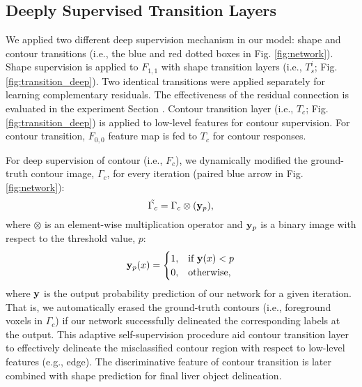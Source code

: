 \documentclass[journal]{IEEEtran}
\begin{document}
\subsection{Deeply Supervised Transition Layers}
We applied two different deep supervision mechanism in our model: shape and contour transitions (i.e., the blue and red dotted boxes in Fig. \ref{fig:network}). Shape supervision is applied to \(F_{1,1}\) with shape transition layers (i.e., \(T^i_s\); Fig. \ref{fig:transition_deep}). Two identical transitions were applied separately for learning complementary residuals. The effectiveness of the residual connection is evaluated in the experiment Section . Contour transition layer (i.e., \(T_c\); Fig. \ref{fig:transition_deep}) is applied to low-level features for contour supervision. For contour transition, \(F_{0,0}\) feature map is fed to \(T_c\) for contour responses.\par

For deep supervision of contour (i.e., \(F_c\)), we dynamically modified the ground-truth contour image, \(\Gamma_c\), for every iteration (paired blue arrow in Fig. \ref{fig:network}):
\newline
\begin{equation}
    \Tilde{\Gamma_c}=\Gamma_c \otimes (\bold{y}_p),
\label{eq:closs1}
\end{equation}
\newline
where \(\otimes\) is an element-wise multiplication operator and \(\bold{y}_p\) is a binary image with respect to the threshold value, \(p\):
\newline
\begin{equation}
    \bold{y}_p(x)=
    \begin{cases}
    1, & \text{if}\ \bold{y}(x)<p \\
    0, & \text{otherwise},
    \end{cases}
\label{eq:closs2}
\end{equation}
\newline
where \(\bold{y}\) is the output probability prediction of our network for a given iteration. That is, we automatically erased the ground-truth contours (i.e., foreground voxels in \(\Gamma_c\)) if our network successfully delineated the corresponding labels at the output. This adaptive self-supervision procedure aid contour transition layer to effectively delineate the misclassified contour region with respect to low-level features (e.g., edge). The discriminative feature of contour transition is later combined with shape prediction for final liver object delineation.
\end{document}
